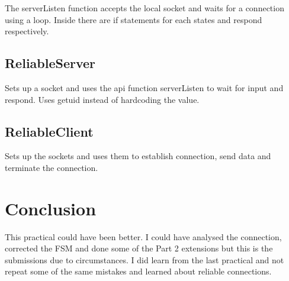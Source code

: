 \documentclass[11pt]{article}
\begin{document}
The serverListen function accepts the local socket and waits for a connection using a loop. Inside there are if statements for each states and respond respectively.
\subsection{ReliableServer}
\label{sec:org0c1fe47}
Sets up a socket and uses the api function serverListen to wait for input and respond. Uses getuid instead of hardcoding the value.
\subsection{ReliableClient}
\label{sec:orgd4e022c}
Sets up the sockets and uses them to establish connection, send data and terminate the connection.
\section{Conclusion}
\label{sec:org2d5b00d}
This practical could have been better. I could have analysed the connection, corrected the FSM and done some of the Part 2 extensions but this is the submissions due to circumstances. I did learn from the last practical and not repeat some of the same mistakes and learned about reliable connections.
\end{document}
